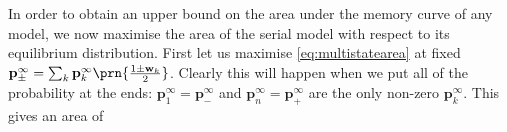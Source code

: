 \documentclass{article} %
\newcommand{\pr}{\mathbf{p}}
\newcommand{\eq}{\pr^\infty}
\newcommand{\w}{\mathbf{w}}
\begin{document}
%

In order to obtain an upper bound on the area under the memory curve of any model, we now maximise the area of the serial model with respect to its equilibrium distribution.
First let us maximise \eqref{eq:multistatearea} at fixed $\eq_\pm = \sum_k \eq_k \prn{\frac{1\pm\w_k}{2}}$.
Clearly this will happen when we put all of the probability at the ends: $\eq_1=\eq_-$ and $\eq_n=\eq_+$ are the only non-zero $\eq_k$.
This gives an area of
\end{document}
